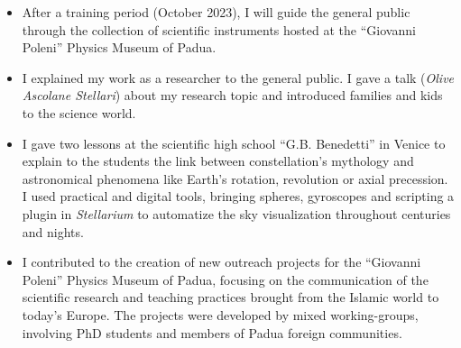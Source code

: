 %
%
%


\begin{experiences}
     {}{
     \begin{itemize}
         \item After a training period (October 2023), I will guide the general public through the collection of scientific instruments hosted at the ``Giovanni Poleni'' Physics Museum of Padua.
     \end{itemize}}
    \emptySeparator
     {}{
     \begin{itemize}
         \item I explained my work as a researcher to the general public. I gave a talk (\emph{Olive Ascolane Stellari}) about my research topic and introduced families and kids to the science world.
     \end{itemize}}
    \emptySeparator
     {}{
     \begin{itemize}
         \item I gave two lessons at the scientific high school ``G.B. Benedetti'' in Venice to explain to the students the link between constellation's mythology and astronomical phenomena like Earth's rotation, revolution or axial precession. I used practical and digital tools, bringing spheres, gyroscopes and scripting a plugin in \emph{Stellarium} to automatize the sky visualization throughout centuries and nights.
     \end{itemize}}
    \emptySeparator
     {}{
     \begin{itemize}
         \item I contributed to the creation of new outreach projects for the ``Giovanni Poleni'' Physics Museum of Padua, focusing on the communication of the scientific research and teaching practices brought from the Islamic world to today's Europe. The projects were developed by mixed working-groups, involving PhD students and members of Padua foreign communities.

\end{itemize}}
\end{experiences}
